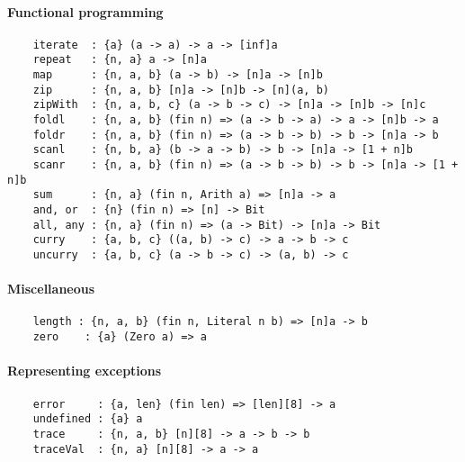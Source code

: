 \paragraph*{Functional programming}
\begin{Verbatim}
    iterate  : {a} (a -> a) -> a -> [inf]a
    repeat   : {n, a} a -> [n]a
    map      : {n, a, b} (a -> b) -> [n]a -> [n]b
    zip      : {n, a, b} [n]a -> [n]b -> [n](a, b)
    zipWith  : {n, a, b, c} (a -> b -> c) -> [n]a -> [n]b -> [n]c
    foldl    : {n, a, b} (fin n) => (a -> b -> a) -> a -> [n]b -> a
    foldr    : {n, a, b} (fin n) => (a -> b -> b) -> b -> [n]a -> b
    scanl    : {n, b, a} (b -> a -> b) -> b -> [n]a -> [1 + n]b
    scanr    : {n, a, b} (fin n) => (a -> b -> b) -> b -> [n]a -> [1 + n]b
    sum      : {n, a} (fin n, Arith a) => [n]a -> a
    and, or  : {n} (fin n) => [n] -> Bit
    all, any : {n, a} (fin n) => (a -> Bit) -> [n]a -> Bit
    curry    : {a, b, c} ((a, b) -> c) -> a -> b -> c
    uncurry  : {a, b, c} (a -> b -> c) -> (a, b) -> c
\end{Verbatim}
\paragraph*{Miscellaneous}
\begin{Verbatim}
    length : {n, a, b} (fin n, Literal n b) => [n]a -> b
    zero    : {a} (Zero a) => a
\end{Verbatim}
\paragraph*{Representing exceptions}
\begin{Verbatim}
    error     : {a, len} (fin len) => [len][8] -> a
    undefined : {a} a
    trace     : {n, a, b} [n][8] -> a -> b -> b
    traceVal  : {n, a} [n][8] -> a -> a
\end{Verbatim}


